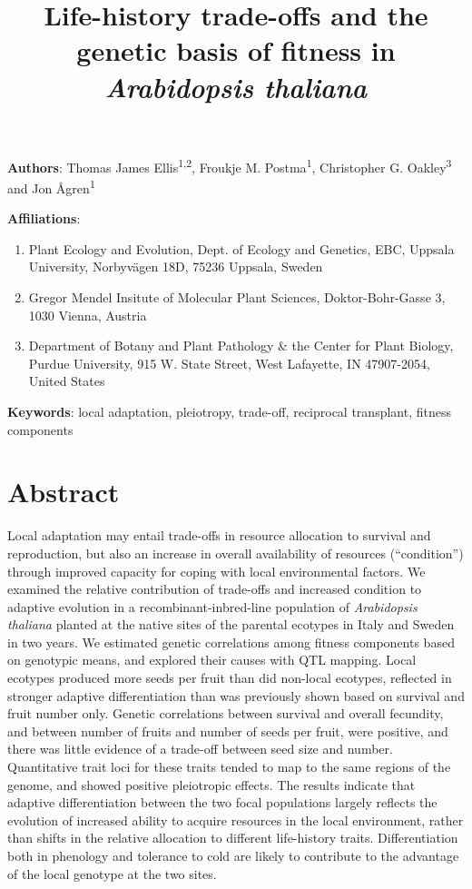\documentclass[]{article}
\title{Life-history trade-offs and the genetic basis of fitness in \emph{Arabidopsis thaliana}}
\author{}
\date{\vspace{-2.5em}}
\providecommand{\tightlist}{%
  \setlength{\itemsep}{0pt}\setlength{\parskip}{0pt}}
\begin{document}
\maketitle

\textbf{Authors}: Thomas James Ellis\textsuperscript{1,2}, Froukje M. Postma\textsuperscript{1}, Christopher G. Oakley\textsuperscript{3} and Jon Ågren\textsuperscript{1}

\textbf{Affiliations}:

\begin{enumerate}
\def\labelenumi{\arabic{enumi}.}
\tightlist
\item
  Plant Ecology and Evolution, Dept. of Ecology and Genetics, EBC, Uppsala University, Norbyvägen 18D, 75236 Uppsala, Sweden
\item
  Gregor Mendel Insitute of Molecular Plant Sciences, Doktor-Bohr-Gasse 3, 1030 Vienna, Austria
\item
  Department of Botany and Plant Pathology \& the Center for Plant Biology, Purdue University, 915 W. State Street, West Lafayette, IN 47907-2054, United States
\end{enumerate}

\textbf{Keywords}: local adaptation, pleiotropy, trade-off, reciprocal transplant, fitness components

\newpage

\hypertarget{abstract}{%
\section{Abstract}\label{abstract}}

Local adaptation may entail trade-offs in resource allocation to survival and reproduction, but also an increase in overall availability of resources (``condition'') through improved capacity for coping with local environmental factors. We examined the relative contribution of trade-offs and increased condition to adaptive evolution in a recombinant-inbred-line population of \emph{Arabidopsis thaliana} planted at the native sites of the parental ecotypes in Italy and Sweden in two years. We estimated genetic correlations among fitness components based on genotypic means, and explored their causes with QTL mapping. Local ecotypes produced more seeds per fruit than did non-local ecotypes, reflected in stronger adaptive differentiation than was previously shown based on survival and fruit number only. Genetic correlations between survival and overall fecundity, and between number of fruits and number of seeds per fruit, were positive, and there was little evidence of a trade-off between seed size and number. Quantitative trait loci for these traits tended to map to the same regions of the genome, and showed positive pleiotropic effects. The results indicate that adaptive differentiation between the two focal populations largely reflects the evolution of increased ability to acquire resources in the local environment, rather than shifts in the relative allocation to different life-history traits. Differentiation both in phenology and tolerance to cold are likely to contribute to the advantage of the local genotype at the two sites.
\end{document}

